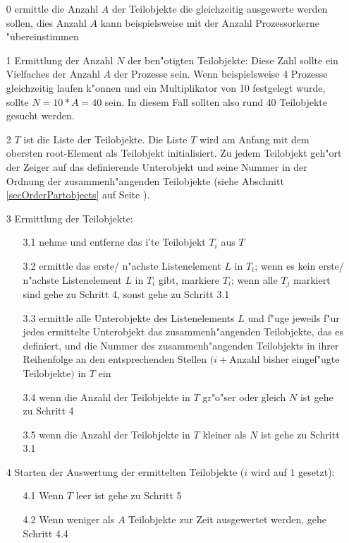 \begin{itemize}
 \item [0] ermittle die Anzahl $A$ der Teilobjekte die gleichzeitig ausgewerte werden sollen, dies Anzahl $A$ kann beispielsweise mit der Anzahl Prozessorkerne "ubereinstimmen
 \item [1] Ermittlung der Anzahl $N$ der ben"otigten Teilobjekte: Diese Zahl sollte ein Vielfaches der Anzahl $A$ der Prozesse sein. Wenn beispielsweise 4 Prozesse gleichzeitig laufen k"onnen und ein Multiplikator von 10 festgelegt wurde, sollte $N=10*A=40$ sein. In diesem Fall sollten also rund $40$ Teilobjekte gesucht werden.
 \item [2] $T$ ist die Liste der Teilobjekte. Die Liste $T$ wird am Anfang mit dem obersten root-Element als Teilobjekt initialisiert. Zu jedem Teilobjekt geh"ort der Zeiger auf das definierende Unterobjekt und seine Nummer in der Ordnung der zusammenh"angenden Teilobjekte (siehe Abschnitt \ref{secOrderPartobjects} auf Seite \pageref{secOrderPartobjects}).
 \item [3] Ermittlung der Teilobjekte:
 \begin{itemize}
  \item [3.1] nehme und entferne das i'te Teilobjekt $T_i$ aus $T$
  \item [3.2] ermittle das erste/ n"achste Listenelement $L$ in $T_i$; wenn es kein erste/ n"achste Listenelement $L$ in $T_i$ gibt, markiere $T_i$; wenn alle $T_j$ markiert sind gehe zu Schritt 4, sonst gehe zu Schritt 3.1
  \item [3.3] ermittle alle Unterobjekte des Listenelements $L$ und f"uge jeweils f"ur jedes ermittelte Unterobjekt das zusammenh"angenden Teilobjekte, das es definiert, und die Nummer des zusammenh"angenden Teilobjekts in ihrer Reihenfolge an den entsprechenden Stellen $(i + $Anzahl bisher eingef"ugte Teilobjekte$)$ in $T$ ein
  \item [3.4] wenn die Anzahl der Teilobjekte in $T$ gr"o"ser oder gleich $N$ ist gehe zu Schritt 4
  \item [3.5] wenn die Anzahl der Teilobjekte in $T$ kleiner als $N$ ist gehe zu Schritt 3.1
 \end{itemize}
 \item [4] Starten der Auswertung der ermittelten Teilobjekte ($i$ wird auf $1$ gesetzt):
 \begin{itemize}
  \item [4.1] Wenn $T$ leer ist gehe zu Schritt 5
  \item [4.2] Wenn weniger als $A$ Teilobjekte zur Zeit ausgewertet werden, gehe Schritt 4.4

\end{itemize}
\end{itemize}
